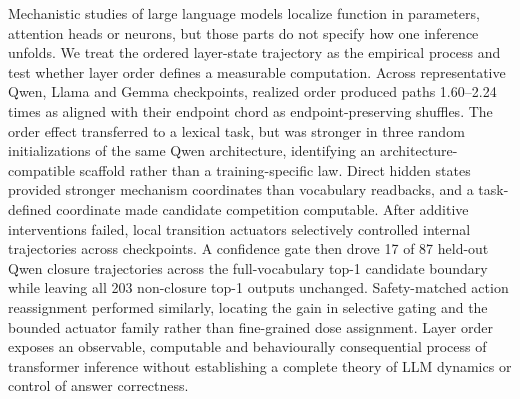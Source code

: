 Mechanistic studies of large language models localize function in parameters, attention heads or neurons, but those parts do not specify how one inference unfolds. We treat the ordered layer-state trajectory as the empirical process and test whether layer order defines a measurable computation. Across representative Qwen, Llama and Gemma checkpoints, realized order produced paths 1.60--2.24 times as aligned with their endpoint chord as endpoint-preserving shuffles. The order effect transferred to a lexical task, but was stronger in three random initializations of the same Qwen architecture, identifying an architecture-compatible scaffold rather than a training-specific law. Direct hidden states provided stronger mechanism coordinates than vocabulary readbacks, and a task-defined coordinate made candidate competition computable. After additive interventions failed, local transition actuators selectively controlled internal trajectories across checkpoints. A confidence gate then drove 17 of 87 held-out Qwen closure trajectories across the full-vocabulary top-1 candidate boundary while leaving all 203 non-closure top-1 outputs unchanged. Safety-matched action reassignment performed similarly, locating the gain in selective gating and the bounded actuator family rather than fine-grained dose assignment. Layer order exposes an observable, computable and behaviourally consequential process of transformer inference without establishing a complete theory of LLM dynamics or control of answer correctness.
